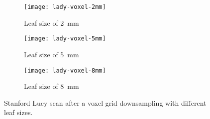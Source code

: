 \begin{figure}[h]
    
    \centering
    \begin{subfigure}[t]{0.3\textwidth}
        \centering
        \texttt{[image: lady-voxel-2mm]}
        \caption{Leaf size of \SI{2}{\milli\meter}}
        \label{figure:lucy-voxel-grid-2mm}
    \end{subfigure}%
    \begin{subfigure}[t]{0.3\textwidth}
        \centering
        \texttt{[image: lady-voxel-5mm]}
        \caption{Leaf size of \SI{5}{\milli\meter}}
        \label{figure:lucy-voxel-grid-5mm}
    \end{subfigure}%
    \begin{subfigure}[t]{0.3\textwidth}
        \centering
        \texttt{[image: lady-voxel-8mm]}
        \caption{Leaf size of \SI{8}{\milli\meter}}
        \label{figure:lucy-voxel-grid-8mm}
    \end{subfigure}

    \caption{Stanford Lucy scan after a voxel grid downsampling with different leaf sizes.}
    \label{figure:lucy-voxel-grid}
\end{figure}